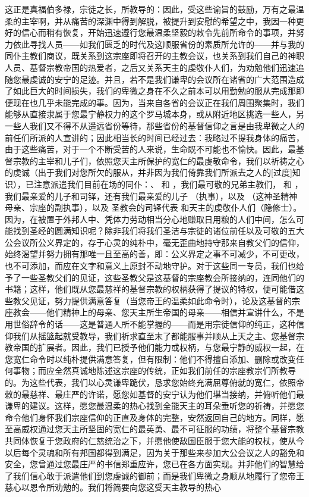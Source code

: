 这正是真福伯多禄，宗徒之长，所教导的：因此，受这些谕旨的鼓励，万有之最温柔的主宰啊，并从痛苦的深渊中得到解脱，被提升到安慰的希望之中，我因一种更好的信心而稍有恢复，开始迅速遵行您最温柔坚毅的敕令先前所命令的事项，并努力依此寻找人员——如我们匮乏的时代及这顺服省份的素质所允许的——并与我的同仆主教们商议，既关系到这宗座即将召开的主教会议，也关系到我们自己的神职人员、基督宗教帝国的热爱者，之后又关系天主的虔敬仆人们，为劝勉他们迅速追随您最虔诚的安宁的足迹。并且，若不是我们谦卑的会议所在诸省的广大范围造成了如此巨大的时间损失，我们的卑微之身在不久之前本可以用勤勉的服从完成那即便现在也几乎未能完成的事。因为，当来自各省的会议正在我们周围聚集时，我们能够从直接隶属于您最宁静权力的这个罗马城本身，或从附近地区挑选一些人，另一些人我们又不得不从遥远省份等待，那些省份的基督信仰之言是由我卑微之人的前任们所派的人宣讲的；因此相当长的时间已经过去：我略过不提我身体的痛苦，由于这些痛苦，对于一个不断受苦的人来说，生命既不可能也不愉快。因此，最基督宗教的主宰和儿子们，依照您天主所保护的宽仁的最虔敬命令，我们以祈祷之心的虔诚（出于我们对您所欠的服从，并非因为我们倚靠我们所派去之人的[过度]知识），已注意派遣我们目前在场的同仆：、 和 ，我们最可敬的兄弟主教们， 和 ，我们最亲爱的儿子和司铎，还有我们最亲爱的儿子 （执事），以及 （这神圣精神母亲、宗座的副执事），以及  圣教会的司铎代表  和天主的虔敬仆人们（隐修士）。因为，在被置于外邦人中、凭体力劳动相当分心地赚取日用粮的人们中间，怎么可能找到圣经的圆满知识呢？除非我们将我们圣洁与宗徒的诸位前任以及可敬的五大公会议所公义界定的，存于心灵的纯朴中，毫无歪曲地持守那来自教父们的信仰，始终渴望并努力拥有那唯一且至高的善，即：公义界定之事不可减少，不可更改，也不可添加，而应在文字和意义上原封不动地守护。对于这些同一专员，我们也给予了一些圣教父们的见证，这些圣教父是这基督的宗座教会所接纳的，连同他们的书籍；这样，他们既从您最慈祥的基督宗教的权柄获得了提议的特权，便可能借这些教父见证，努力提供满意答复（当您帝王的温柔如此命令时），论及这基督的宗座教会——他们精神上的母亲、您天主所生帝国的母亲——相信并宣讲什么，不是用世俗辞令的话——这是普通人所不能掌握的——而是用宗徒信仰的纯正，这种信仰我们从摇篮起就受教导，我们祈求直至末了都能服事并顺从上天之主、您基督宗教帝国的扩展者。因此，我们已授予他们能力或权柄，与您最宁静的威权一起，在您宽仁命令时以纯朴提供满意答复，但有限制：他们不得擅自添加、删除或改变任何事物；而应全然真诚地陈述这宗座的传统，正如我们前任的宗座教宗们所教导的。为这些代表，我们以心灵谦卑跪伏，恳求您始终充满屈尊俯就的宽仁，依照帝敕的最慈祥、最庄严的许诺，愿您如基督的安宁认为他们堪当接纳，并俯听他们最谦卑的建议。这样，愿您最温柔的热心找到全能天主的耳朵垂听您的祈祷，并愿您命令他们身怀我们宗座信仰的正直及身体的完整，安然返回自己的地方。同样，愿至高威权通过您天主所坚固的宽仁的最英勇、最不可征服的功绩，将整个基督宗教共同体恢复于您政府的仁慈统治之下，并愿他使敌国臣服于您大能的权杖，使从今以后每个灵魂和所有邦国都得到满足，因为关于那些来参加大公会议之人的豁免和安全，您曾通过您最庄严的书信郑重应许，您已在各方面实现。并非他们的智慧给了我们信心敢于派遣他们到您虔诚的御前；而是我们卑微之身顺从地履行了您帝王慈心以恩令所劝勉的。我们将简要向您这受天主教导的热心